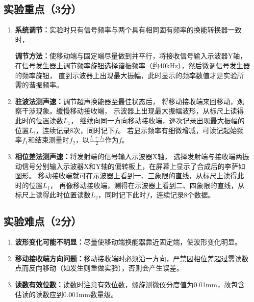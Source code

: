 \documentclass{../template/Report}
\begin{document}
\subsection{实验重点（3分）}
\begin{enumerate}
	\item \textbf{系统调节：}实验时只有信号频率与两个具有相同固有频率的换能转换器一致时，

	      \textbf{调节方法：}使移动端与固定端尽量做到并平行，将接收信号输入示波器Y轴，
	      在信号发生器上调节频率旋钮选择谐振频率（约40\si{\kilo\hertz}），然后微调信号发生器的频率旋钮，
	      直到示波器上出现最大振幅，此时显示的频率数值才是实验所需的谐振频率。

	\item \textbf{驻波法测声速：}调节超声换能器至最佳状态后，
	      将移动接收端来回移动，观察干涉现象。缓慢移动接收端，
	      示波器上出现最大振幅波形，从标尺上读得此时的位置读数$L_1$，
	      继续向同一方向移动接收端，逐次记录出现最大振幅的位置$L_i$，连续记录8次，同时记下$f$。
	      若显示频率有细微增减，可读记起始频率$f_1$和结束测量时$f_2$，以$\frac{f_1+f_2}{2}$作为$f$。

	\item \textbf{相位差法测声速：}将发射端的信号输入示波器X轴，
	      选择发射端与接收端两振动信号分别输入示波器X和Y轴的偏转板上，在屏幕上显示了合成后的李萨如图形。
	      移动接收端就可在示波器上看到一、三象限的直线，从标尺上读得此时的位置$L_1$，
	      再像移动接收端，测得在示波器上看到二、四象限的直线，从标尺上读得此时位置读数$L_2$，同时记下此时$f$，连续记录8个数据。
\end{enumerate}
\subsection{实验难点（2分）}
\begin{enumerate}
	\item \textbf{波形变化可能不明显：}尽量使移动端换能器靠近固定端，使波形变化明显。
	\item \textbf{移动接收端方向问题：}移动接收端时必须沿一方向，严禁因相位差超过需读数点而反向移动（如发生则重做实验），否则会产生误差。
	\item \textbf{读数有效位数：}读数时注意有效位数，螺旋测微仪分度值为0.01\si{\milli\metre}，故包含估读的读数应到0.001\si{\milli\metre}数量级。
\end{enumerate}
\end{document}
